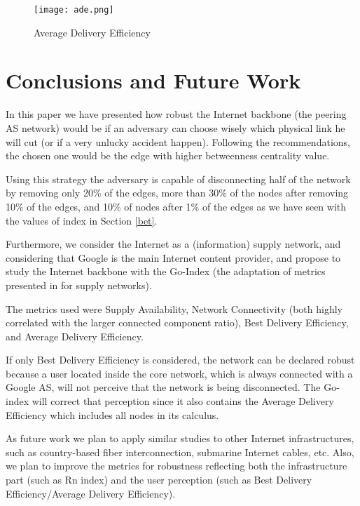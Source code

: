 \documentclass{sig-alternate-10pt}
\begin{document}
\begin{figure}[th!]
  \centering
  \texttt{[image: ade.png]}
  \caption{Average Delivery Efficiency}
  \label{fig:ade}
\end{figure}

\section{Conclusions and Future Work}
\label{conclusions}

In this paper we have presented how robust the Internet backbone (the peering AS network) would be
if an adversary can choose wisely which physical link he will cut (or if a very unlucky accident happen).
Following the recommendations, the chosen one would be the edge with higher
betweenness centrality value. 

Using this strategy the adversary is capable of disconnecting half of the network by removing only 20\% of the edges, more than 30\% of the nodes after removing 10\% of the edges, and 10\% of nodes after 1\% of the edges as we have seen with the values of  index in Section  \ref{bet}.

Furthermore, we consider the Internet as a (information) supply network,
and considering that Google is the main Internet content provider, 
and propose to study the Internet backbone with the Go-Index 
(the adaptation of metrics presented in \cite{zhao2011achieving}  for supply networks).

The metrics used were Supply Availability, Network Connectivity (both highly correlated with the larger connected component ratio), 
Best Delivery Efficiency, and Average Delivery Efficiency.

If only Best Delivery Efficiency is considered, the network can be declared robust 
because a user located inside the core network, which is always connected with a Google AS, 
will not perceive that the network is being disconnected. The Go-index will correct that perception since it also contains the Average Delivery Efficiency which includes all nodes in its calculus. 

As future work we plan to apply similar studies to other Internet infrastructures, 
such as country-based fiber interconnection, submarine Internet cables, etc. 
Also, we plan to improve the metrics for robustness reflecting both 
the infrastructure part (such as Rn index) and the user perception 
(such as Best Delivery Efficiency/Average Delivery Efficiency).
\end{document}
